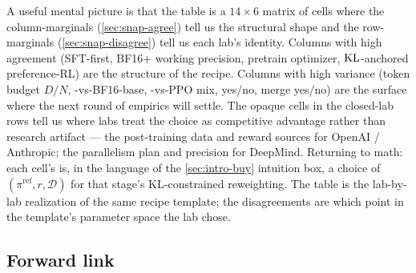 \begin{intuition}
A useful mental picture is that the table is a $14 \times 6$ matrix
of cells where the column-marginals (\cref{sec:snap-agree}) tell us
the structural shape and the row-marginals (\cref{sec:snap-disagree})
tell us each lab's identity. Columns with high agreement
(SFT-first, BF16+ working precision,  pretrain optimizer,
$\operatorname{KL}$-anchored preference-RL) are the structure of the recipe.
Columns with high variance (token budget $D/N$, -vs-BF16-base,
-vs-PPO mix,  yes/no, merge yes/no)
are the surface where the next round of empirics will settle. The
opaque cells in the closed-lab rows tell us where labs treat the
choice as competitive advantage rather than research artifact ---
the post-training data and reward sources for OpenAI / Anthropic;
the parallelism plan and precision for DeepMind. Returning to math:
each cell's  is, in the language of the
\cref{sec:intro-buy} intuition box, a choice of $(\pi^{\mathrm{ref}}, r,
\mathcal{D})$ for that stage's KL-constrained reweighting. The
table is the lab-by-lab realization of the same recipe template;
the disagreements are which point in the template's parameter
space the lab chose.
\end{intuition}

\subsection{Forward link}
\label{sec:snap-forward}

